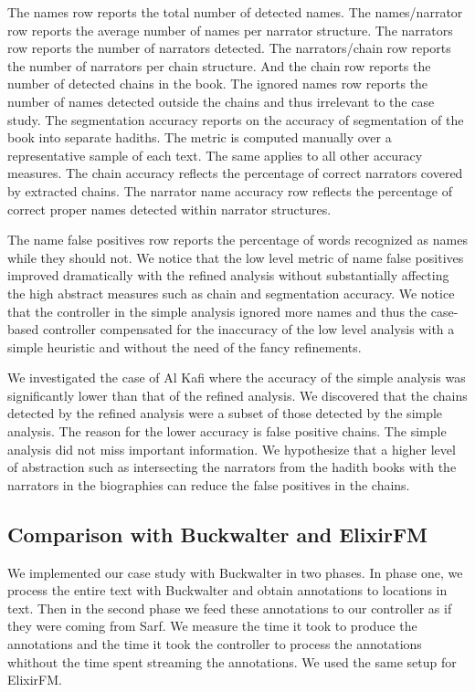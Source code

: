\documentclass[11pt]{article}
\begin{document}
The names row reports the total number of detected names. The names/narrator row reports the average
number of names per narrator structure. The narrators row reports the number of narrators detected.
The narrators/chain row reports the number of narrators per chain structure. And the chain row reports
the number of detected chains in the book.
The ignored names row reports the number of names detected outside the chains and thus irrelevant to
the case study.
The segmentation accuracy reports on the accuracy of segmentation of the book into separate hadiths.
The metric is computed manually over a representative sample of each text. The same applies to all other accuracy measures.
The chain accuracy reflects the percentage of correct narrators covered by extracted chains.
The narrator name accuracy row reflects the percentage of correct proper names detected within
narrator structures.

The name false positives row reports the percentage of words recognized as names while they should not.
We notice that the low level metric of name false positives improved dramatically with the refined
analysis without substantially affecting the high abstract measures such as chain and segmentation
accuracy.
We notice that the controller in the simple analysis ignored more names and thus the case-based
controller compensated for the inaccuracy of the low level analysis with a simple heuristic and
without the need of the fancy refinements.

We investigated the case of Al Kafi where the accuracy of the simple analysis was significantly lower than that of the refined
analysis. We  discovered that the chains detected by the refined analysis were a subset of those detected by the simple
analysis. 
The reason for the lower accuracy is false positive chains. 
The simple analysis did not miss important information. 
We hypothesize that a higher level of abstraction such as intersecting the narrators from the hadith books with the narrators 
in the biographies can reduce the false positives in the chains.

\subsection{Comparison with Buckwalter and ElixirFM}

We implemented our case study with Buckwalter in two phases. 
In phase one, we process the entire text with Buckwalter and
obtain annotations to locations in text. 
Then in the second phase we feed these annotations to 
our controller as if they were coming from Sarf. 
We measure the time it took to produce the annotations
and the time it took the controller to process the 
annotations whithout the time spent streaming the annotations.
We used the same setup for ElixirFM. 
\end{document}
